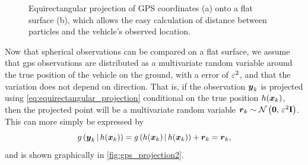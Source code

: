 \begin{knitrout}\small
{}\color{fgcolor}\begin{figure}

{\centering {}

}

\caption[Equirectangular projection of GPS coordinates onto a flat surface]{Equirectangular projection of GPS coordinates ({\sc a}) onto a flat surface ({\sc b}), which allows the easy calculation of distance between particles and the vehicle's observed location.}\label{fig:gps_projection}
\end{figure}


\end{knitrout}


Now that spherical observations can be compared on a flat surface, we assume that \gls{gps} observations are distributed as a multivariate random variable around the true position of the vehicle on the ground, with a \GPS{} error of $\varepsilon^2$, and that the variation does not depend on direction. That is, if the observation $\boldsymbol{y}_k$ is projected using \cref{eq:equirectangular_projection} conditional on the true position $h(\boldsymbol x_k)$, then the projected point will be a multivariate random variable $\boldsymbol{r}_k \sim \mathcal{N}\left(\boldsymbol{0},\, \varepsilon^2 \mathbf{I}\right)$. This can more simply be expressed by
\begin{equation}
\label{eq:gps_error_model}
g\left(\boldsymbol{y}_k\,|\,h(\boldsymbol x_k)\right) =
    g\left(h(\boldsymbol x_k)\,|\,h(\boldsymbol x_k)\right) + \boldsymbol{r}_k
    = \boldsymbol{r}_k,
\end{equation}
and is shown graphically in \cref{fig:gps_projection2}.

